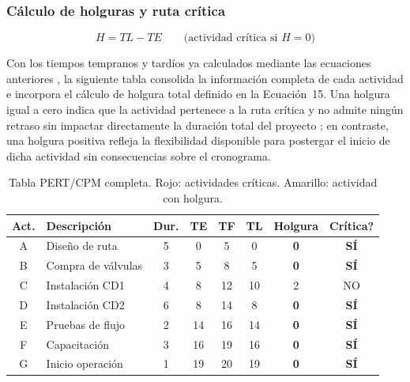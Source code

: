 \documentclass[12pt,a4paper]{article}
\begin{document}
\subsubsection{C\'{a}lculo de holguras y ruta cr\'{i}tica}

\begin{equation}
  H = TL - TE \qquad \text{(actividad cr\'{i}tica si } H = 0\text{)}
\end{equation}

Con los tiempos tempranos y tard\'{i}os ya calculados mediante las ecuaciones anteriores 
\cite{taha2012}, la siguiente tabla consolida la informaci\'{o}n completa de cada actividad 
e incorpora el c\'{a}lculo de holgura total definido en la Ecuaci\'{o}n~15. Una holgura 
igual a cero indica que la actividad pertenece a la ruta cr\'{i}tica y no admite ning\'{u}n 
retraso sin impactar directamente la duraci\'{o}n total del proyecto \cite{render2012}; en 
contraste, una holgura positiva refleja la flexibilidad disponible para postergar el inicio 
de dicha actividad sin consecuencias sobre el cronograma.

\begin{table}[H]
  \centering
  \begin{tabular}{|c|l|c|c|c|c|c|c|}
    \hline
    \rowcolor{azulClaro}
    \textbf{Act.} & \textbf{Descripci\'{o}n} & \textbf{Dur.} & \textbf{TE} & \textbf{TF} &
    \textbf{TL} & \textbf{Holgura} & \textbf{Cr\'{i}tica?} \\
    \hline
    \rowcolor{red!12}
    A & Dise\~{n}o de ruta     & 5 & 0  & 5  & 0  & \textbf{0} & \textbf{S\'{I}} \\
    \hline
    \rowcolor{red!12}
    B & Compra de v\'{a}lvulas & 3 & 5  & 8  & 5  & \textbf{0} & \textbf{S\'{I}} \\
    \hline
    \rowcolor{amarilloHolgura}
    C & Instalaci\'{o}n CD1    & 4 & 8  & 12 & 10 & 2 & NO \\
    \hline
    \rowcolor{red!12}
    D & Instalaci\'{o}n CD2    & 6 & 8  & 14 & 8  & \textbf{0} & \textbf{S\'{I}} \\
    \hline
    \rowcolor{red!12}
    E & Pruebas de flujo        & 2 & 14 & 16 & 14 & \textbf{0} & \textbf{S\'{I}} \\
    \hline
    \rowcolor{red!12}
    F & Capacitaci\'{o}n       & 3 & 16 & 19 & 16 & \textbf{0} & \textbf{S\'{I}} \\
    \hline
    \rowcolor{red!12}
    G & Inicio operaci\'{o}n   & 1 & 19 & 20 & 19 & \textbf{0} & \textbf{S\'{I}} \\
    \hline
  \end{tabular}
  \caption{Tabla PERT/CPM completa. Rojo: actividades cr\'{i}ticas. Amarillo: actividad con holgura.}
\end{table}
\end{document}

